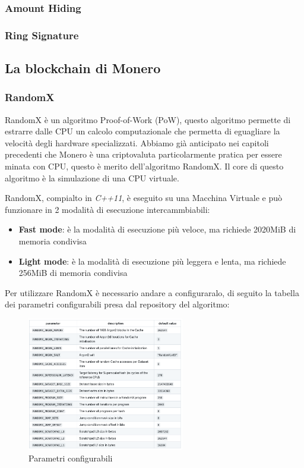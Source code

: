 \documentclass[12pt,a4paper]{article}
\begin{document}
\subsubsection{Amount Hiding}

\subsubsection{Ring Signature}

\subsection{La blockchain di Monero}

\subsubsection{RandomX}
RandomX è un algoritmo Proof-of-Work (PoW), questo algoritmo permette di
estrarre dalle CPU un calcolo computazionale che permetta di eguagliare la
velocità degli hardware specializzati. Abbiamo già anticipato nei capitoli
precedenti che Monero è una criptovaluta particolarmente pratica per essere
minata con CPU, questo è merito dell'algoritmo RandomX. Il core di questo
algoritmo è la simulazione di una CPU virtuale.

RandomX, compialto in \textit{C++11}, è eseguito su una Macchina Virtuale e può
funzionare in 2 modalità di esecuzione intercammbiabili:

\begin{itemize}
    \item \textbf{Fast mode}: è la modalità di esecuzione più veloce, ma
    richiede 2020MiB di memoria condivisa
    \item \textbf{Light mode}: è la modalità di esecuzione più leggera e lenta,
    ma richiede 256MiB di memoria condivisa
\end{itemize}

Per utilizzare RandomX è necessario andare a configuraralo, di seguito la
tabella dei parametri configurabili presa dal repository del algoritmo:

\begin{figure}[h]
    \centering
    \includegraphics[width=0.61\textwidth]{./images/randomx_parameters.png}
    \caption{Parametri configurabili}
    \label{fig:parameters}
\end{figure}
\end{document}
